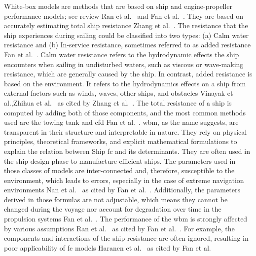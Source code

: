 White-box models are methods that are based on ship and engine-propeller performance models; see review Ran et al.~\citep{YAN2021102489} and Fan et al.~\citep{fanReviewShipFuel}.
They are based on accurately estimating total ship resistance Zhang et al.~\citep{zhangDeepLearningMethod2024}. The resistance that the ship experiences during sailing could be classified into two types: (a) Calm water resistance and (b) In-service resistance, sometimes referred to as added resistance Fan et al.~\citep{fanReviewShipFuel}.
Calm water resistance refers to the hydrodynamic effects the ship encounters when sailing in undisturbed waters, such as viscous or wave-making resistance, which are generally caused by the ship. In contrast, added resistance is based on the environment. It refers to the hydrodynamics effects on a ship from external factors such as winds, waves, other ships, and obstacles Vinayak et al.,Zhihua et al.~\citep{vinayaketal2021, LIU2020107246} as cited by Zhang et al.~\citep{zhangDeepLearningMethod2024}. The total resistance of a ship is computed by adding both of those components, and the most common methods used are the towing tank and \ac{cfd} Fan et al.~\citep{fanReviewShipFuel}. \ac{wbm}, as the name suggests, are transparent in their structure and interpretable in nature. They rely on physical principles, theoretical frameworks, and explicit mathematical formulations to explain the relation between Ship \ac{fc} and its determinants. They are often used in the ship design phase to manufacture efficient ships.
The parameters used in those classes of models are inter-connected and, therefore, susceptible to the environment, which leads to errors, especially in the case of extreme navigation environments Nan et al.~\citep{WEI2021121036} as cited by Fan et al.~\citep{fanReviewShipFuel}. Additionally, the parameters derived in those formulas are not adjustable, which means they cannot be changed during the voyage nor account for degradation over time in the propulsion systems Fan et al.~\citep{fanReviewShipFuel}.
The performance of the \ac{wbm} is strongly affected by various assumptions Ran et al.~\citep{YAN2021102489} as cited by Fan et al.~\citep{fanReviewShipFuel}.
For example, the components and interactions of the ship resistance are often ignored, resulting in poor applicability of \ac{fc} models Haranen et al.~\citep{haranenWhiteGreyBlackBox} as cited by Fan et al.~\citep{fanReviewShipFuel}

